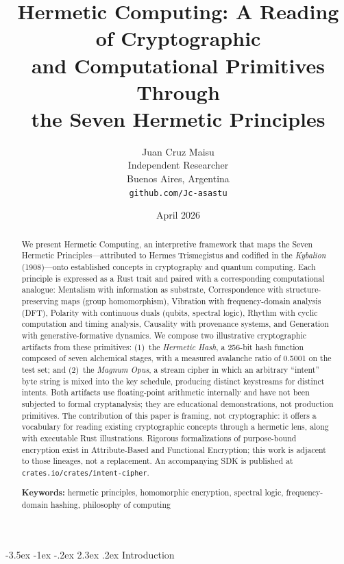 \documentclass[12pt,a4paper]{article}
\title{Hermetic Computing: A Reading of Cryptographic\\and Computational Primitives Through\\the Seven Hermetic Principles}
\author{
  Juan Cruz Maisu\\
  Independent Researcher\\
  Buenos Aires, Argentina\\
  \texttt{github.com/Jc-asastu}
}
\date{April 2026}
\makeatletter
\renewcommand\section{\@startsection{section}{1}{\z@}%
  {-3.5ex \@plus -1ex \@minus -.2ex}%
  {2.3ex \@plus.2ex}%
  {\needspace{10\baselineskip}\normalfont\Large\bfseries\sloppy\hyphenpenalty=10000\exhyphenpenalty=10000\hbadness=10000}}
\makeatother
\begin{document}
\maketitle

\begin{abstract}
We present Hermetic Computing, an interpretive framework that maps the Seven Hermetic Principles---attributed to Hermes Trismegistus and codified in the \textit{Kybalion} (1908)---onto established concepts in cryptography and quantum computing. Each principle is expressed as a Rust trait and paired with a corresponding computational analogue: Mentalism with information as substrate, Correspondence with structure-preserving maps (group homomorphism), Vibration with frequency-domain analysis (DFT), Polarity with continuous duals (qubits, spectral logic), Rhythm with cyclic computation and timing analysis, Causality with provenance systems, and Generation with generative-formative dynamics. We compose two illustrative cryptographic artifacts from these primitives: (1)~the \textit{Hermetic Hash}, a 256-bit hash function composed of seven alchemical stages, with a measured avalanche ratio of 0.5001 on the test set; and (2)~the \textit{Magnum Opus}, a stream cipher in which an arbitrary ``intent'' byte string is mixed into the key schedule, producing distinct keystreams for distinct intents. Both artifacts use floating-point arithmetic internally and have not been subjected to formal cryptanalysis; they are educational demonstrations, not production primitives. The contribution of this paper is framing, not cryptographic: it offers a vocabulary for reading existing cryptographic concepts through a hermetic lens, along with executable Rust illustrations. Rigorous formalizations of purpose-bound encryption exist in Attribute-Based and Functional Encryption; this work is adjacent to those lineages, not a replacement. An accompanying SDK is published at \texttt{crates.io/crates/intent-cipher}.

\medskip
\noindent\textbf{Keywords:} hermetic principles, homomorphic encryption, spectral logic, frequency-domain hashing, philosophy of computing
\end{abstract}

\clearpage

\section{Introduction}
\end{document}
